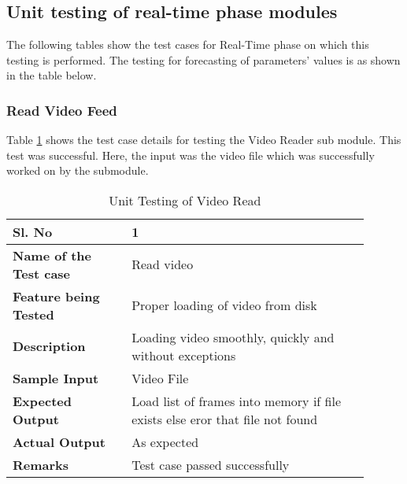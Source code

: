     \subsection{Unit testing of real-time phase modules}
    The following tables show the test cases for Real-Time phase on which this testing is performed. The testing for forecasting of parameters’ values is as shown in the table below.

    \subsubsection{Read Video Feed}

    Table \ref{table:unit-video-read} shows the test case details for testing the Video Reader sub module. This test was successful. Here, the input was the video file which was successfully worked on by the submodule.


    \FloatBarrier
    \begin{table}[H]
        \begin{tabular}{|p{0.3\linewidth}|p{0.6\linewidth}|}
            \hline
            \textbf{Sl. No }              &\textbf{ 1}\\
            \hline
            \textbf{Name of the Test case}  & Read video \\
            \hline
            \textbf{Feature being Tested}  & Proper loading of video from disk \\
            \hline
            \textbf{Description}           &  Loading video smoothly, quickly and without exceptions \\
            \hline
            \textbf{Sample Input}          & Video File \\
            \hline
            \textbf{Expected Output}       & Load list of frames into memory if file exists else eror that file not found \\
            \hline
            \textbf{Actual Output}         & As expected \\
            \hline
            \textbf{Remarks }              & Test case passed successfully \\
            \hline
        \end{tabular}
        \caption{Unit Testing of Video Read}
        \label{table:unit-video-read}
    \end{table}


